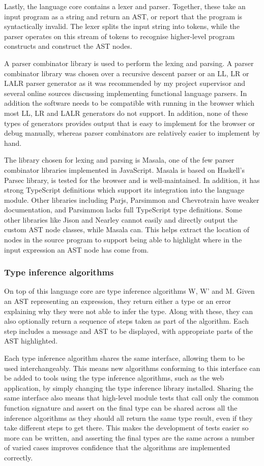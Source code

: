 \documentclass[a4paper,fleqn,12pt]{article}
\begin{document}
Lastly, the language core contains a lexer and parser. Together, these take an input program as a string and return an AST, or report that the program is syntactically invalid. The lexer splits the input string into tokens, while the parser operates on this stream of tokens to recognise higher-level program constructs and construct the AST nodes.

A parser combinator library is used to perform the lexing and parsing. A parser combinator library was chosen over a recursive descent parser or an LL, LR or LALR parser generator as it was recommended by my project supervisor and several online sources discussing implementing functional language parsers. In addition the software needs to be compatible with running in the browser which most LL, LR and LALR generators do not support. In addition, none of these types of generators provides output that is easy to implement for the browser or debug manually, whereas parser combinators are relatively easier to implement by hand.

The library chosen for lexing and parsing is Masala, one of the few parser combinator libraries implemented in JavaScript. Masala is based on Haskell’s Parsec library, is tested for the browser and is well-maintained. In addition, it has strong TypeScript definitions which support its integration into the language module. Other libraries including Parjs, Parsimmon and Chevrotrain have weaker documentation, and Parsimmon lacks full TypeScript type definitions. Some other libraries like Jison and Nearley cannot easily and directly output the custom AST node classes, while Masala can. This helps extract the location of nodes in the source program to support being able to highlight where in the input expression an AST node has come from.
\subsubsection{Type inference algorithms}\label{id:h.75leuokwbltp}
On top of this language core are type inference algorithms W, W’ and M. Given an AST representing an expression, they return either a type or an error explaining why they were not able to infer the type. Along with these, they can also optionally return a sequence of steps taken as part of the algorithm. Each step includes a message and AST to be displayed, with appropriate parts of the AST highlighted.

Each type inference algorithm shares the same interface, allowing them to be used interchangeably. This means new algorithms conforming to this interface can be added to tools using the type inference algorithms, such as the web application, by simply changing the type inference library installed. Sharing the same interface also means that high-level module tests that call only the common function signature and assert on the final type can be shared across all the inference algorithms as they should all return the same type result, even if they take different steps to get there. This makes the development of tests easier so more can be written, and asserting the final types are the same across a number of varied cases improves confidence that the algorithms are implemented correctly.
\end{document}
